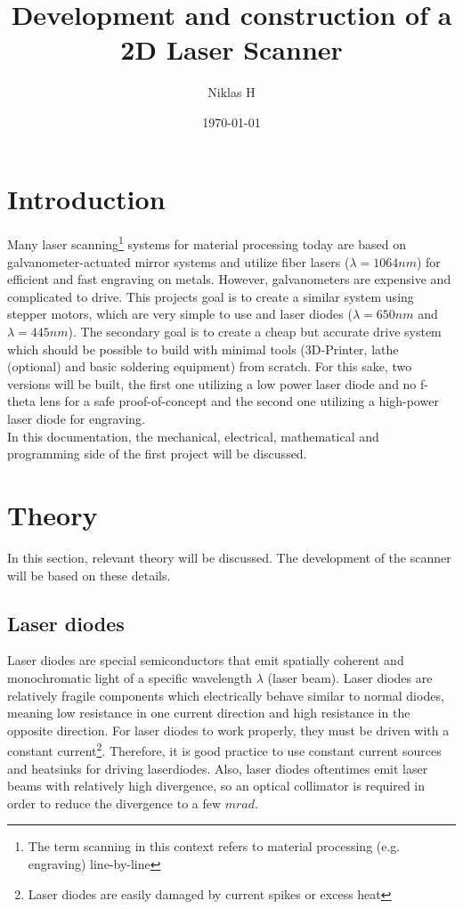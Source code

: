 \documentclass[a4paper, 11pt]{scrartcl}
\title {Development and construction of a 2D Laser Scanner}
\author {Niklas H}
\date {\today}
\begin{document}
\maketitle
\tableofcontents
\newpage
\section{Introduction}
Many laser scanning\footnote{The term scanning in this context refers to material processing (e.g. engraving) line-by-line} systems for material processing today are based on galvanometer-actuated mirror systems and utilize fiber lasers ($\lambda = 1064nm$) for efficient and fast engraving on metals. However, galvanometers are expensive and complicated to drive.  This projects goal is to create a similar system using stepper motors, which are very simple to use and laser diodes ($\lambda=650nm$ and $\lambda=445nm$). The secondary goal is to create a cheap but accurate drive system which should be possible to build with minimal tools (3D-Printer, lathe (optional) and basic soldering equipment) from scratch. For this sake, two versions will be built, the first one utilizing a low power laser diode and no f-theta lens for a safe proof-of-concept and the second one utilizing a high-power laser diode for engraving. \\
In this documentation, the mechanical, electrical, mathematical and programming side of the first project will be discussed.

\section{Theory}
In this section, relevant theory will be discussed. The development of the scanner will be based on these details. \\
\subsection{Laser diodes} 
Laser diodes are special semiconductors that emit spatially coherent and monochromatic light of a specific wavelength $\lambda$ (laser beam). Laser diodes are relatively fragile components which electrically behave similar to normal diodes, meaning low resistance in one current direction and high resistance in the opposite direction. For laser diodes to work properly, they must be driven with a constant current\footnote{Laser diodes are easily damaged by current spikes or excess heat}. Therefore, it is good practice to use constant current sources and heatsinks for driving laserdiodes. Also, laser diodes oftentimes emit laser beams with relatively high divergence, so an optical collimator is required in order to reduce the divergence to a few $mrad$. 
\end{document}
